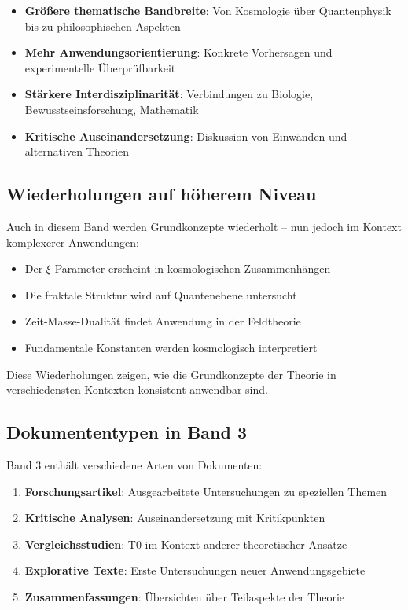 \begin{itemize}
\item \textbf{Größere thematische Bandbreite}: Von Kosmologie über Quantenphysik bis zu philosophischen Aspekten
\item \textbf{Mehr Anwendungsorientierung}: Konkrete Vorhersagen und experimentelle Überprüfbarkeit
\item \textbf{Stärkere Interdisziplinarität}: Verbindungen zu Biologie, Bewusstseinsforschung, Mathematik
\item \textbf{Kritische Auseinandersetzung}: Diskussion von Einwänden und alternativen Theorien
\end{itemize}

\subsection*{Wiederholungen auf höherem Niveau}

Auch in diesem Band werden Grundkonzepte wiederholt -- nun jedoch im Kontext komplexerer Anwendungen:

\begin{itemize}
\item Der $\xi$-Parameter erscheint in kosmologischen Zusammenhängen
\item Die fraktale Struktur wird auf Quantenebene untersucht
\item Zeit-Masse-Dualität findet Anwendung in der Feldtheorie
\item Fundamentale Konstanten werden kosmologisch interpretiert
\end{itemize}

Diese Wiederholungen zeigen, wie die Grundkonzepte der Theorie in verschiedensten Kontexten konsistent anwendbar sind.

\subsection*{Dokumententypen in Band 3}

Band 3 enthält verschiedene Arten von Dokumenten:

\begin{enumerate}
\item \textbf{Forschungsartikel}: Ausgearbeitete Untersuchungen zu speziellen Themen
\item \textbf{Kritische Analysen}: Auseinandersetzung mit Kritikpunkten
\item \textbf{Vergleichsstudien}: T0 im Kontext anderer theoretischer Ansätze
\item \textbf{Explorative Texte}: Erste Untersuchungen neuer Anwendungsgebiete
\item \textbf{Zusammenfassungen}: Übersichten über Teilaspekte der Theorie
\end{enumerate}

